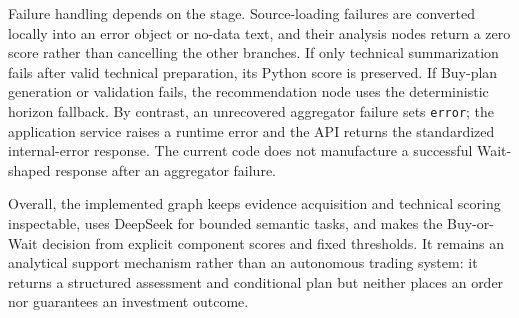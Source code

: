 Failure handling depends on the stage. Source-loading failures are converted locally into an error object or no-data text, and their analysis nodes return a zero score rather than cancelling the other branches. If only technical summarization fails after valid technical preparation, its Python score is preserved. If Buy-plan generation or validation fails, the recommendation node uses the deterministic horizon fallback. By contrast, an unrecovered aggregator failure sets \texttt{error}; the application service raises a runtime error and the API returns the standardized internal-error response. The current code does not manufacture a successful Wait-shaped response after an aggregator failure.

Overall, the implemented graph keeps evidence acquisition and technical scoring inspectable, uses DeepSeek for bounded semantic tasks, and makes the Buy-or-Wait decision from explicit component scores and fixed thresholds. It remains an analytical support mechanism rather than an autonomous trading system: it returns a structured assessment and conditional plan but neither places an order nor guarantees an investment outcome.
